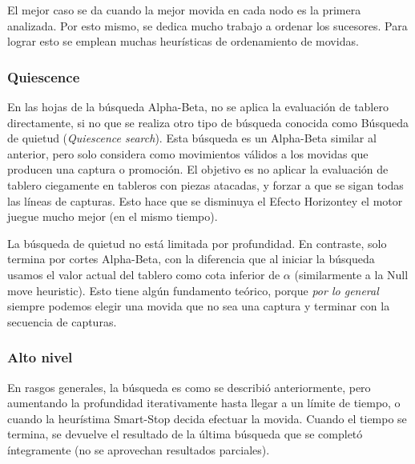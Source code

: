\documentclass{article}
\begin{document}
\begin{multicols}{2}

El mejor caso se da cuando la mejor movida en cada nodo es la
primera analizada. Por esto mismo, se dedica mucho trabajo a ordenar
los sucesores. Para lograr esto se emplean muchas heurísticas de
ordenamiento de movidas.
\\

\subsubsection{Quiescence}

En las hojas de la búsqueda Alpha-Beta, no se aplica la evaluación
de tablero directamente, si no que se realiza otro tipo de búsqueda
conocida como Búsqueda de quietud (\emph{Quiescence search}). Esta
búsqueda es un Alpha-Beta similar al anterior, pero solo considera
como movimientos válidos a los movidas que producen una captura
o promoción. El objetivo es no aplicar la evaluación de tablero
ciegamente en tableros con piezas atacadas, y forzar a que se sigan
todas las líneas de capturas. Esto hace que se disminuya el Efecto
Horizonte\footnotemark y el motor juegue mucho mejor (en el mismo tiempo).
\\


La búsqueda de quietud no está limitada por profundidad. En contraste,
solo termina por cortes Alpha-Beta, con la diferencia que al iniciar
la búsqueda usamos el valor actual del tablero como cota inferior de
$\alpha$ (similarmente a la Null move heuristic). Esto tiene algún
fundamento teórico, porque \emph{por lo general} siempre podemos
elegir una movida que no sea una captura y terminar con la secuencia de
capturas.
\\

\subsubsection{Alto nivel}

En rasgos generales, la búsqueda es como se describió anteriormente,
pero aumentando la profundidad iterativamente hasta llegar a un límite
de tiempo, o cuando la heurístima Smart-Stop decida efectuar la movida.
Cuando el tiempo se termina, se devuelve el resultado de la última
búsqueda que se completó íntegramente (no se aprovechan resultados
parciales).
\\


\end{multicols}
\end{document}
